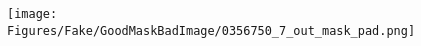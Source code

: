\documentclass[runningheads]{llncs}
\begin{document}
\begin{figure}[tb]
\texttt{[image: Figures/Fake/GoodMaskBadImage/0356750\_7\_out\_mask\_pad.png]} \\%
\end{figure}
\end{document}
